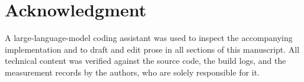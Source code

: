 \section*{Acknowledgment}
A large-language-model coding assistant was used to inspect the accompanying
implementation and to draft and edit prose in all sections of this manuscript.
All technical content was verified against the source code, the build logs, and
the measurement records by the authors, who are solely responsible for it.
